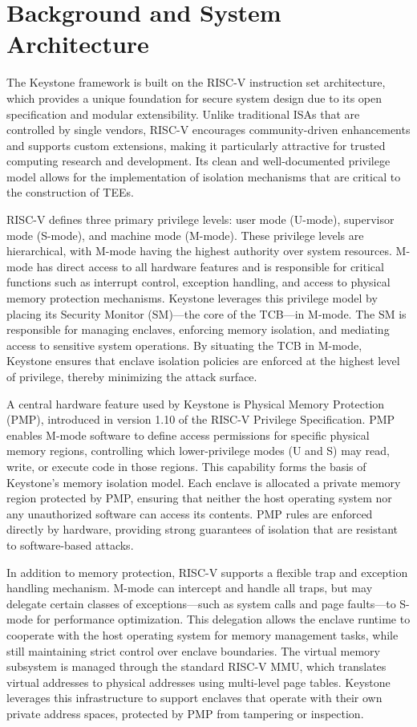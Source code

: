 \chapter{Background and System Architecture}
\label{chap:background}


The Keystone framework is built on the RISC-V instruction set architecture, which provides a unique foundation for secure system design due to its open specification and modular extensibility. Unlike traditional ISAs that are controlled by single vendors, RISC-V encourages community-driven enhancements and supports custom extensions, making it particularly attractive for trusted computing research and development. Its clean and well-documented privilege model allows for the implementation of isolation mechanisms that are critical to the construction of TEEs.

RISC-V defines three primary privilege levels: user mode (U-mode), supervisor mode (S-mode), and machine mode (M-mode). These privilege levels are hierarchical, with M-mode having the highest authority over system resources. M-mode has direct access to all hardware features and is responsible for critical functions such as interrupt control, exception handling, and access to physical memory protection mechanisms. Keystone leverages this privilege model by placing its Security Monitor (SM)—the core of the TCB—in M-mode. The SM is responsible for managing enclaves, enforcing memory isolation, and mediating access to sensitive system operations. By situating the TCB in M-mode, Keystone ensures that enclave isolation policies are enforced at the highest level of privilege, thereby minimizing the attack surface.

A central hardware feature used by Keystone is Physical Memory Protection (PMP), introduced in version 1.10 of the RISC-V Privilege Specification. PMP enables M-mode software to define access permissions for specific physical memory regions, controlling which lower-privilege modes (U and S) may read, write, or execute code in those regions. This capability forms the basis of Keystone’s memory isolation model. Each enclave is allocated a private memory region protected by PMP, ensuring that neither the host operating system nor any unauthorized software can access its contents. PMP rules are enforced directly by hardware, providing strong guarantees of isolation that are resistant to software-based attacks.

In addition to memory protection, RISC-V supports a flexible trap and exception handling mechanism. M-mode can intercept and handle all traps, but may delegate certain classes of exceptions—such as system calls and page faults—to S-mode for performance optimization. This delegation allows the enclave runtime to cooperate with the host operating system for memory management tasks, while still maintaining strict control over enclave boundaries. The virtual memory subsystem is managed through the standard RISC-V MMU, which translates virtual addresses to physical addresses using multi-level page tables. Keystone leverages this infrastructure to support enclaves that operate with their own private address spaces, protected by PMP from tampering or inspection.

